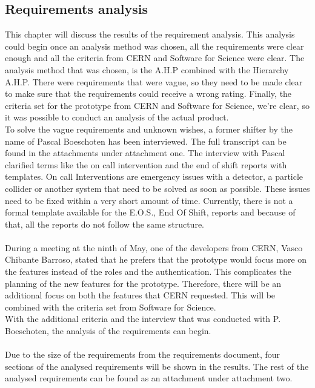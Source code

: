 \documentclass[paper=a4, fontsize=11pt,twoside]{scrartcl}	%
\begin{document}
\subsection{Requirements analysis}
This chapter will discuss the results of the requirement analysis. This analysis could begin once an analysis method was chosen, all the requirements were clear enough and all the criteria from CERN and Software for Science were clear. The analysis method that was chosen, is the A.H.P combined with the Hierarchy A.H.P. There were requirements that were vague, so they need to be made clear to make sure that the requirements could receive a wrong rating. Finally, the criteria set for the prototype from CERN and Software for Science, we're clear, so it was possible to conduct an analysis of the actual product. \\
To solve the vague requirements and unknown wishes, a former shifter by the name of Pascal Boeschoten has been interviewed. The full transcript can be found in the attachments under attachment one. The interview with Pascal clarified  terms like the on call intervention and the end of shift reports with templates. On call Interventions are emergency issues with a detector, a particle collider or another system that need to be solved as soon as possible. These issues need to be fixed within a very short amount of time. Currently, there is not a formal template available for the E.O.S., End Of Shift, reports  and because of that, all the reports do not follow the same structure.\\ \\
During a meeting at the ninth of May, one of the developers from CERN, Vasco Chibante Barroso, stated that he prefers that the prototype would focus more on the features instead of the roles and the authentication. This complicates the planning of the new features for the prototype. Therefore, there will be an additional focus on both the features that CERN requested. This will be combined with the criteria set from Software for Science. \\ 
With the additional criteria and the interview that was conducted with P. Boeschoten, the analysis of the requirements can begin. \\ \\


Due to the size of the requirements from the requirements document, four sections of the analysed requirements will be shown in the results. The rest of the analysed requirements can be found as an attachment under attachment two.\\
\end{document}
